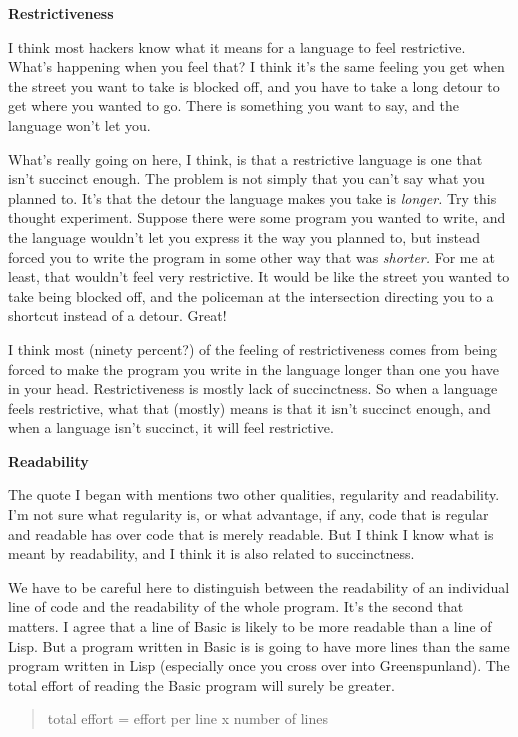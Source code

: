 \textbf{Restrictiveness}

I think most hackers know what it means for a language to feel
restrictive. What's happening when you feel that? I think it's the same
feeling you get when the street you want to take is blocked off, and you
have to take a long detour to get where you wanted to go. There is
something you want to say, and the language won't let you.

What's really going on here, I think, is that a restrictive language is
one that isn't succinct enough. The problem is not simply that you can't
say what you planned to. It's that the detour the language makes you
take is \emph{longer.} Try this thought experiment. Suppose there were
some program you wanted to write, and the language wouldn't let you
express it the way you planned to, but instead forced you to write the
program in some other way that was \emph{shorter.} For me at least, that
wouldn't feel very restrictive. It would be like the street you wanted
to take being blocked off, and the policeman at the intersection
directing you to a shortcut instead of a detour. Great!

I think most (ninety percent?) of the feeling of restrictiveness comes
from being forced to make the program you write in the language longer
than one you have in your head. Restrictiveness is mostly lack of
succinctness. So when a language feels restrictive, what that (mostly)
means is that it isn't succinct enough, and when a language isn't
succinct, it will feel restrictive.

\textbf{Readability}

The quote I began with mentions two other qualities, regularity and
readability. I'm not sure what regularity is, or what advantage, if any,
code that is regular and readable has over code that is merely readable.
But I think I know what is meant by readability, and I think it is also
related to succinctness.

We have to be careful here to distinguish between the readability of an
individual line of code and the readability of the whole program. It's
the second that matters. I agree that a line of Basic is likely to be
more readable than a line of Lisp. But a program written in Basic is is
going to have more lines than the same program written in Lisp
(especially once you cross over into Greenspunland). The total effort of
reading the Basic program will surely be greater.

\begin{quote}
total effort = effort per line x number of lines
\end{quote}

